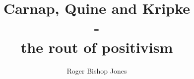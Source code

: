 \usepackage[T1]{fontenc}
\usepackage{textcomp}
\renewcommand{\rmdefault}{ppl}
\linespread{1.04}

\makeatletter
\def\cleardoublepage{\clearpage\if@twoside \ifodd\c@page\else
\hbox{}
\vspace*{\fill}
\begin{center}
\end{center}
\vspace{\fill}
\thispagestyle{empty}
\newpage
\if@twocolumn\hbox{}\newpage\fi\fi\fi}
\makeatother

\usepackage{fancyhdr}
\pagestyle{fancyplain}

\usepackage[twoside,paperwidth=5in,paperheight=8in,hmargin={0.75in,0.5in},vmargin={0.5in,0.5in},includehead,includefoot]{geometry}
\usepackage{tocloft}
\usepackage{tocbibind}
\makeindex
\newcommand{\indexentry}[2]{\item #1 #2}
\newcommand{\ignore}[1]{}

\fancyhfoffset[EL,RO]{0pt}
\newcommand{\aref}{}
\newcommand{\bookname}{}
\renewcommand{\chaptermark}[1]{\markboth{#1}{}}
\renewcommand{\sectionmark}[1]{\markright{#1}}
\lhead[\fancyplain{}{\thepage}]         {\fancyplain{}{}}
\chead[\fancyplain{}{\slshape\leftmark}]                 {\fancyplain{}{\slshape\rightmark}}
\rhead[\fancyplain{}{}]       {\fancyplain{}{\thepage}}
\lfoot[\fancyplain{}{\aref}]            {\fancyplain{}{}}
\cfoot[\fancyplain{}{}]                 {\fancyplain{}{}}
\rfoot[\fancyplain{}{}]                 {\fancyplain{}{\aref}}

\renewcommand{\headrulewidth}{0pt}

\title{Carnap, Quine and Kripke\\ \Large - \\ the rout of positivism}
\author{Roger Bishop Jones}
\date{\ }


\frontmatter

